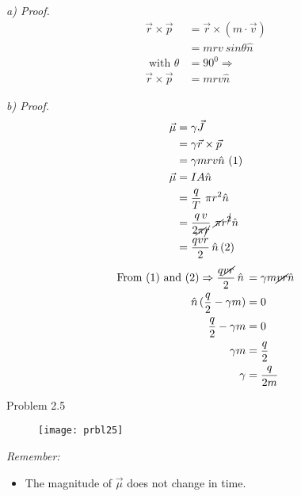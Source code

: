 \textit{a) Proof.}
\begin{align*}
    \vec{r} \times \vec{p} & = \vec{r} \times (m \cdot \vec{v}) \\
    & = m r v \ sin\theta \hat{n}\\
    \text{ with } \theta & = 90^0 \Rightarrow \\
    \vec{r} \times \vec{p} & = m r v \hat{n}
\end{align*}

\textit{b) Proof.}
\begin{align*}
	\vec{\mu} &= \gamma \vec{J} \\
	          &= \gamma \vec{r} \times \vec{p} \\
	          &= \gamma m r v \hat{n}\ (1) \\
	\vec{\mu} &= I A \hat{n} \\
	          &= \frac{q}{T} \ \pi r^2 \hat{n} \\
	          &= \frac{q \, v}{2 \cancel{\pi} \cancel{r}} \ \cancel{\pi} 
	          r^{\cancel{2}} \hat{n}  \\
	          &= \frac{qvr}{2} \, \hat{n} \, (2)
\end{align*}
\begin{align*}
\text{From (1) and (2)} \Rightarrow \frac{q\cancel{vr}}{2} \, \hat{n} 
\,  &= \gamma m \cancel{vr} \hat{n} \\
			\hat{n} \, (\frac{q}{2} - \gamma m) &= 0 \\
			\frac{q}{2} - \gamma m &= 0 \\
			\gamma m &= \frac{q}{2} \\
			\gamma &= \frac{q}{2m}
\end{align*}

\clearpage
\Large{Problem 2.5}

\begin{figure}[H]
        \centering
        \texttt{[image: prbl25]}
        \label{fig:prbl25}
\end{figure}

\textit{Remember:}
\begin{itemize}
	\item The magnitude of $\vec{\mu}$ does not change in time.
\end{itemize}


